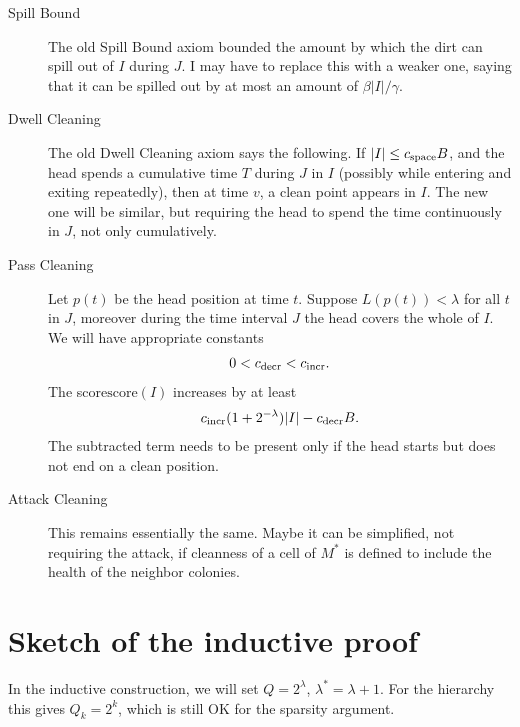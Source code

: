 \documentclass[12pt]{memoir}
\renewcommand{\le}{\leq}
\def\B{B}
\newcommand{\score}{\mathrm{score}}
\newcommand{\Tu}{T}
\newcommand{\Cns}[2]{#1_{\textrm{\upshape #2}}}
\newcommand{\cns}[1]{\Cns{c}{#1}}
\newcommand{\cSpace}{\cns{space}}
\newcommand{\cDecr}{\cns{decr}}
\newcommand{\cIncr}{\cns{incr}}
\begin{document}
\begin{description}
\item[Spill Bound] 
The old Spill Bound axiom bounded the amount by which the dirt can spill out
of \( I \) during \( J \).
I may have to replace this with a weaker one, saying
that it can be spilled out by at most an amount of \( \beta |I|/\gamma \).

\item[Dwell Cleaning]
The old Dwell Cleaning axiom says the following.
If \( |I| \le \cSpace\B \), and the head spends a cumulative time  \( \Tu \)  during \( J \)
in \( I \) (possibly while entering and exiting repeatedly),
then at time \( v \), a clean point appears in \( I \).
The new one will be similar, but requiring the head to spend the time continuously in \( J \),
not only cumulatively.


\item[Pass Cleaning]
Let \( p(t) \) be the head position at time \( t \).
Suppose \( L(p(t))<\lambda \) for all \( t \) in \( J \), moreover
during the time interval \( J \) the head covers the whole of \( I \).
We will have appropriate constants 
\begin{align*}
   0<\cDecr<\cIncr.
 \end{align*}
The score\( \score(I) \) increases by at least 
\begin{align*}
 \cIncr(1+2^{-\lambda})|I|-\cDecr\B .
 \end{align*}
The subtracted term needs to be present only if the head starts but does not end
on a clean position.

\item[Attack Cleaning]
This remains essentially the same.
Maybe it can be  simplified, not requiring the attack, if cleanness of a cell of \( M^{*} \) is
defined to include the health of the neighbor colonies.
\end{description}


\section{Sketch of the inductive proof}

In the inductive construction, we will set \( Q=2^{\lambda} \), \( \lambda^{*}=\lambda+1 \).
For the hierarchy this gives \( Q_{k}=2^{k} \), which is still OK for the sparsity argument.
\end{document}
